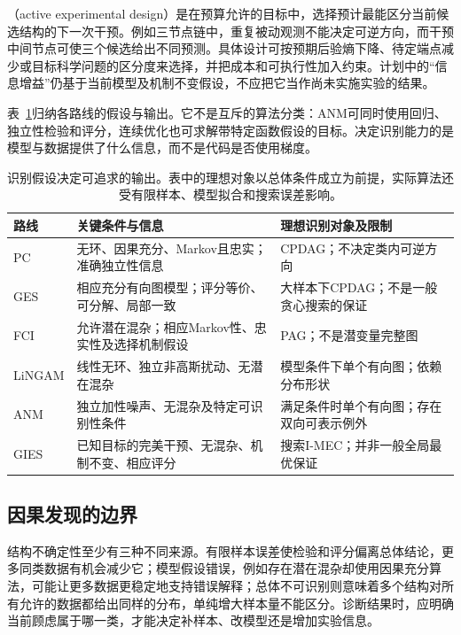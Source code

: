 （active experimental design）是在预算允许的目标中，选择预计最能区分当前候选结构的下一次干预。例如三节点链中，重复被动观测不能决定可逆方向，而干预中间节点可使三个候选给出不同预测。具体设计可按预期后验熵下降、待定端点减少或目标科学问题的区分度来选择，并把成本和可执行性加入约束。计划中的“信息增益”仍基于当前模型及机制不变假设，不应把它当作尚未实施实验的结果。

表~\ref{tab:pgm-structure-learning-causal-routes}归纳各路线的假设与输出。它不是互斥的算法分类：ANM可同时使用回归、独立性检验和评分，连续优化也可求解带特定函数假设的目标。决定识别能力的是模型与数据提供了什么信息，而不是代码是否使用梯度。

\begin{table}[htbp]
  \centering
  \small
  \begin{tabularx}{\linewidth}{@{}lXX@{}}
    \toprule
    路线 & 关键条件与信息 & 理想识别对象及限制 \\
    \midrule
    PC & 无环、因果充分、Markov且忠实；准确独立性信息 & CPDAG；不决定类内可逆方向 \\
    GES & 相应充分有向图模型；评分等价、可分解、局部一致 & 大样本下CPDAG；不是一般贪心搜索的保证 \\
    FCI & 允许潜在混杂；相应Markov性、忠实性及选择机制假设 & PAG；不是潜变量完整图 \\
    LiNGAM & 线性无环、独立非高斯扰动、无潜在混杂 & 模型条件下单个有向图；依赖分布形状 \\
    ANM & 独立加性噪声、无混杂及特定可识别性条件 & 满足条件时单个有向图；存在双向可表示例外 \\
    GIES & 已知目标的完美干预、无混杂、机制不变、相应评分 & 搜索I-MEC；并非一般全局最优保证 \\
    \bottomrule
  \end{tabularx}
  \caption{识别假设决定可追求的输出。表中的理想对象以总体条件成立为前提，实际算法还受有限样本、模型拟合和搜索误差影响。}
  \label{tab:pgm-structure-learning-causal-routes}
\end{table}

\subsection{因果发现的边界}
\label{sec:pgm-structure-learning-causal-limits}

结构不确定性至少有三种不同来源。有限样本误差使检验和评分偏离总体结论，更多同类数据有机会减少它；模型假设错误，例如存在潜在混杂却使用因果充分算法，可能让更多数据更稳定地支持错误解释；总体不可识别则意味着多个结构对所有允许的数据都给出同样的分布，单纯增大样本量不能区分。诊断结果时，应明确当前顾虑属于哪一类，才能决定补样本、改模型还是增加实验信息。


